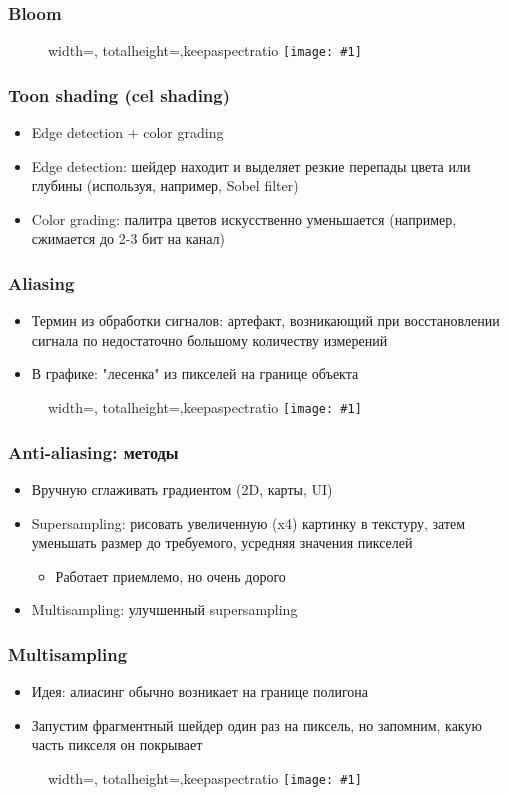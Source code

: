 \documentclass{beamer}
\newcommand{\slideimage}[1]{
  \begin{figure}
    \begin{adjustbox}{width=\textwidth, totalheight=\textheight-2\baselineskip-2\baselineskip,keepaspectratio}
      \texttt{[image: \#1]}
    \end{adjustbox}
  \end{figure}
}
\begin{document}
\begin{frame}[fragile]
\frametitle{Bloom}
\slideimage{bloom-diagram.png}
\end{frame}

\begin{frame}[fragile]
\frametitle{Toon shading (cel shading)}
\begin{itemize}
\item Edge detection + color grading
\pause
\item Edge detection: шейдер находит и выделяет резкие перепады цвета или глубины (используя, например, Sobel filter)
\pause
\item Color grading: палитра цветов искусственно уменьшается (например, сжимается до 2-3 бит на канал)
\end{itemize}
\end{frame}

\begin{frame}[fragile]
\frametitle{Aliasing}
\begin{itemize}
\item Термин из обработки сигналов: артефакт, возникающий при восстановлении сигнала по недостаточно большому количеству измерений
\pause
\item В графике: "лесенка" из пикселей на границе объекта
\end{itemize}
\slideimage{aliasing.png}
\end{frame}

\begin{frame}[fragile]
\frametitle{Anti-aliasing: методы}
\begin{itemize}
\item Вручную сглаживать градиентом (2D, карты, UI)
\pause
\item Supersampling: рисовать увеличенную (x4) картинку в текстуру, затем уменьшать размер до требуемого, усредняя значения пикселей
\pause
\begin{itemize}
\item Работает приемлемо, но очень дорого
\end{itemize}
\pause
\item Multisampling: улучшенный supersampling
\end{itemize}
\end{frame}

\begin{frame}[fragile]
\frametitle{Multisampling}
\begin{itemize}
\item Идея: алиасинг обычно возникает на границе полигона
\pause
\item Запустим фрагментный шейдер один раз на пиксель, но запомним, какую часть пикселя он покрывает
\end{itemize}
\slideimage{multisampling.png}
\end{frame}
\end{document}
